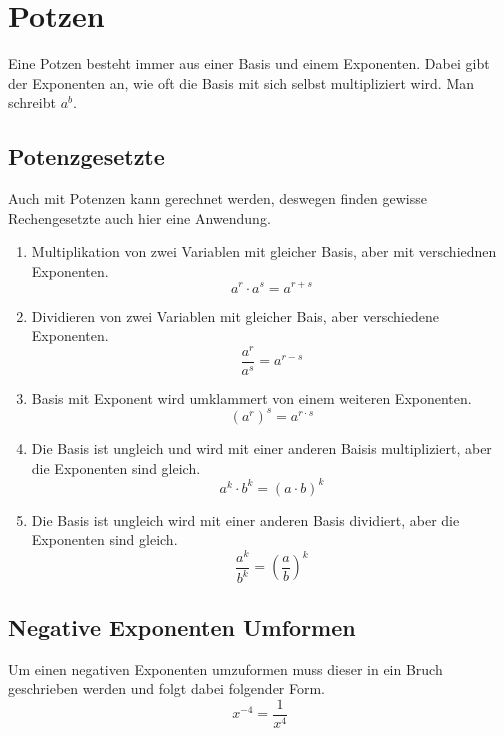 \section{Potzen}
Eine Potzen besteht immer aus einer Basis und einem Exponenten. Dabei gibt der Exponenten an, wie oft die Basis mit sich selbst multipliziert wird. Man schreibt $a^b$. 
\subsection{Potenzgesetzte} Auch mit Potenzen kann gerechnet werden, deswegen finden gewisse Rechengesetzte auch hier eine Anwendung.
\begin{enumerate}
	\item Multiplikation von zwei Variablen mit gleicher Basis, aber mit verschiednen Exponenten. \[a^r\cdot a^s=a^{r+s}\]
	\item Dividieren von zwei Variablen mit gleicher Bais, aber verschiedene Exponenten. \[\frac{a^r}{a^s}=a^{r-s}\]
	\item Basis mit Exponent wird umklammert von einem weiteren Exponenten. \[(a^r)^s=a^{r\cdot s}\]
	\item Die Basis ist ungleich und wird mit einer anderen Baisis multipliziert, aber die Exponenten sind gleich.\[a^k \cdot b^k =(a\cdot b)^k\]
	\item Die Basis ist ungleich wird mit einer anderen Basis dividiert, aber die Exponenten sind gleich. \[\frac{a^k}{b^k}=\left(\frac{a}{b}\right)^k\]
\end{enumerate}
\subsection{Negative Exponenten Umformen}
Um einen negativen Exponenten umzuformen muss dieser in ein Bruch geschrieben werden und folgt dabei folgender Form. \[x^{-4}=\frac{1}{x^4}\]